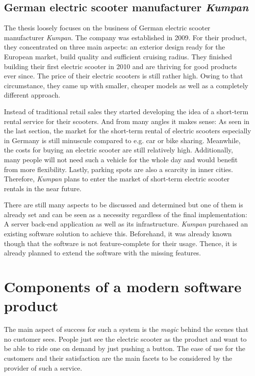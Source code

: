 \documentclass[12pt,a4paper]{report}
\begin{document}
\subsection{German electric scooter manufacturer \textit{Kumpan}} \label{sect:kumpan}

The thesis loosely focuses on the business of German electric scooter manufacturer \textit{Kumpan}.
The company was established in 2009. For their product, they concentrated on three main aspects:
an exterior design ready for the European market, build quality and sufficient cruising radius.
They finished building their first electric scooter in 2010 and are thriving for good products ever since.
The price of their electric scooters is still rather high. Owing to that circumstance,
they came up with smaller, cheaper models as well as a completely different approach.

Instead of traditional retail sales they started developing the idea of a
short-term rental service for their scooters. And from many angles it makes sense:
As seen in the last section, the market for the short-term rental of electric scooters
especially in Germany is still minuscule compared to e.g. car or bike sharing.
Meanwhile, the costs for buying an electric scooter are still relatively high.
Additionally, many people will not need such a vehicle for the whole day and would benefit
from more flexibility. Lastly, parking spots are also a scarcity in inner cities.
Therefore, \textit{Kumpan} plans to enter the market of short-term electric scooter rentals
in the near future.

There are still many aspects to be discussed and determined but one of them
is already set and can be seen as a necessity regardless of the final implementation:
A server back-end application as well as its infrastructure.
\textit{Kumpan} purchased an existing software solution to achieve this.
Beforehand, it was already known though that the software is not feature-complete
for their usage. Thence, it is already planned to extend the software with the missing
features.


\section{Components of a modern software product} \label{sect:frontend/backend}

The main aspect of success for such a system is the \textit{magic} behind the scenes
that no customer sees. People just see the electric scooter as the product and
want to be able to ride one on demand by just pushing a button.
The ease of use for the customers and their satisfaction are the main facets
to be considered by the provider of such a service.
\end{document}
